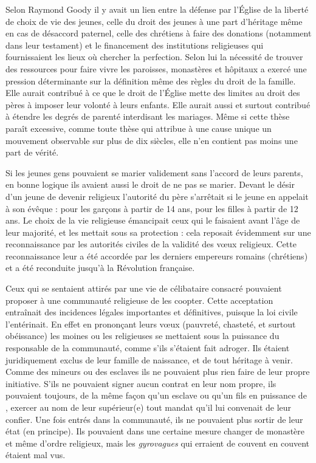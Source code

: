  Selon Raymond Goody il y avait un lien entre la défense par l'Église de la liberté de choix de vie des jeunes, celle du droit des jeunes à une part d'héritage même en cas de désaccord paternel, celle des chrétiens à faire des donations (notamment dans leur testament) et le financement des institutions religieuses qui fournissaient les lieux où chercher la perfection. Selon lui la nécessité de trouver des ressources pour faire vivre les paroisses, monastères et hôpitaux a exercé une pression déterminante sur la définition même des règles du droit de la famille. Elle aurait contribué à ce que le droit de l'Église mette des limites au droit des pères à imposer leur volonté à leurs enfants. Elle aurait aussi et surtout contribué à étendre les degrés de parenté interdisant les mariages. Même si cette thèse paraît excessive, comme toute thèse qui attribue à une cause unique un mouvement observable sur plus de dix siècles, elle n'en contient pas moins une part de vérité. 

 Si les jeunes gens pouvaient se marier validement sans l'accord de leurs parents, en bonne logique ils avaient aussi le droit de ne pas se marier. Devant le désir d'un jeune de devenir religieux l'autorité du père s'arrêtait si le jeune en appelait à son évêque : pour les garçons à partir de 14 ans, pour les filles à partir de 12 ans. Le choix de la vie religieuse émancipait ceux qui le faisaient avant l'âge de leur majorité, et les mettait sous sa protection : cela reposait évidemment sur une reconnaissance par les autorités civiles de la validité des vœux religieux. Cette reconnaissance leur a été accordée par les derniers empereurs romains (chrétiens) et a été reconduite jusqu'à la Révolution française.

 Ceux qui se sentaient attirés par une vie de célibataire consacré pouvaient proposer à une communauté religieuse de les coopter. Cette acceptation entraînait des incidences légales importantes et définitives, puisque la loi civile l'entérinait. En effet en prononçant leurs vœux (pauvreté, chasteté, et surtout obéissance) les moines ou les religieuses se mettaient sous la puissance du responsable de la communauté, comme s'ils s'étaient fait adroger. Ils étaient juridiquement exclus de leur famille de naissance, et de tout héritage à venir. Comme des mineurs ou des esclaves ils ne pouvaient plus rien faire de leur propre initiative. S'ils ne pouvaient signer aucun contrat en leur nom propre, ils pouvaient toujours, de la même façon qu'un esclave ou qu'un fils en puissance de , exercer au nom de leur supérieur(e) tout mandat qu'il lui convenait de leur confier. Une fois entrés dans la communauté, ils ne pouvaient plus sortir de leur état (en principe). Ils pouvaient dans une certaine mesure changer de monastère et même d'ordre religieux, mais les \emph{gyrovagues} qui erraient de couvent en couvent étaient mal vus. 

